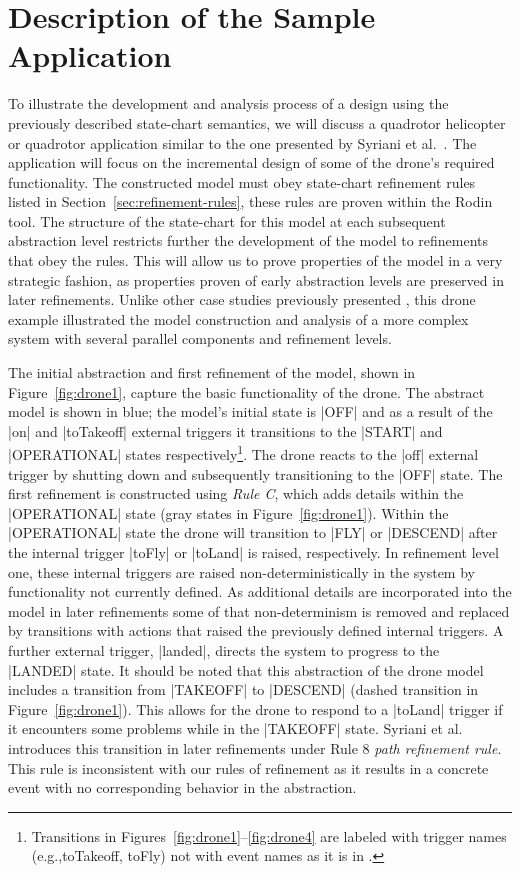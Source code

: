 \section{Description of the Sample Application}
\label{sec:descr-sample-appl}

To illustrate the development and analysis process of a design using the previously described 
state-chart semantics, we will discuss a quadrotor helicopter or quadrotor application similar to 
the one presented by Syriani et al.~\cite{Syriani_2019}. 
The application will focus on the incremental design of some of the drone's required functionality.
The constructed model must obey state-chart refinement rules listed in Section~\ref{sec:refinement-rules}, these rules are proven within the Rodin tool.
The structure of the state-chart for this model at each subsequent abstraction level restricts further the development of the model to refinements that obey the rules. 
This will allow us to prove properties of the model in a very strategic fashion, as properties proven of early abstraction levels are preserved in later refinements.
Unlike other case studies previously presented \cite{MoSn16,MoSnHo18,MoSnHo-ABZ2020}, this drone example
illustrated the model construction and analysis of a more complex system with several parallel components 
and refinement levels. 

The initial abstraction and first refinement of the model, shown in Figure~\ref{fig:drone1}, capture the basic functionality of the drone. 
The abstract model is shown in blue; the model's initial state is |OFF| and as a result of the |on| and  |toTakeoff| external triggers it transitions to the |START| and |OPERATIONAL| states respectively\footnote{Transitions in Figures~\ref{fig:drone1}--\ref{fig:drone4} are labeled with trigger names
(e.g.,toTakeoff, toFly) not with event names as it is in \UMLB.}. 
The drone reacts to the |off| external trigger by shutting down and subsequently transitioning to the |OFF| state.
The first refinement is constructed using \emph{Rule C}, which adds details within the |OPERATIONAL| state (gray states in Figure~\ref{fig:drone1}).
Within the |OPERATIONAL| state the drone will transition to |FLY| or |DESCEND| after the internal trigger |toFly| or |toLand| is raised, respectively. 
In refinement level one, these internal triggers are raised non-deterministically in the system by functionality not currently defined.
As additional details are incorporated into the model in later refinements some of that non-determinism is 
removed and replaced by transitions with actions that raised the previously defined internal triggers.
A further external trigger, |landed|, directs the system to progress to the |LANDED| state.
It should be noted that this abstraction of the drone model includes a transition from |TAKEOFF| to |DESCEND| (dashed transition in Figure~\ref{fig:drone1}). 
This allows for the drone to respond to a |toLand| trigger if it encounters some problems while in the |TAKEOFF| state.
Syriani et al.~\cite{Syriani_2019} introduces this transition in later refinements under Rule 8 \emph{path refinement rule}. 
This rule is inconsistent with our rules of refinement as it results in a concrete event with no corresponding behavior in the abstraction.

